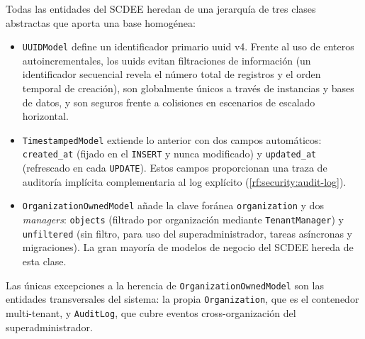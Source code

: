Todas las entidades del SCDEE heredan de una jerarquía de tres clases
abstractas que aporta una base homogénea:

\begin{itemize}
  \item \texttt{UUIDModel} define un identificador primario \acs{uuid}
  v4. Frente al uso de enteros autoincrementales, los \acsp{uuid} evitan
  filtraciones de información (un identificador secuencial revela el
  número total de registros y el orden temporal de creación), son
  globalmente únicos a través de instancias y bases de datos, y son
  seguros frente a colisiones en escenarios de escalado horizontal.

  \item \texttt{TimestampedModel} extiende lo anterior con dos campos
  automáticos: \texttt{created\_at} (fijado en el \texttt{INSERT} y
  nunca modificado) y \texttt{updated\_at} (refrescado en cada
  \texttt{UPDATE}). Estos campos proporcionan una traza de auditoría
  implícita complementaria al log explícito
  (\cref{rf:security:audit-log}).

  \item \texttt{OrganizationOwnedModel} añade la clave foránea
  \texttt{organization} y dos \textit{managers}: \texttt{objects}
  (filtrado por organización mediante \texttt{TenantManager}) y
  \texttt{unfiltered} (sin filtro, para uso del superadministrador,
  tareas asíncronas y migraciones). La gran mayoría de modelos de
  negocio del SCDEE hereda de esta clase.
\end{itemize}

Las únicas excepciones a la herencia de \texttt{OrganizationOwnedModel}
son las entidades transversales del sistema: la propia
\texttt{Organization}, que es el contenedor multi-tenant, y
\texttt{AuditLog}, que cubre eventos cross-organización del
superadministrador.
